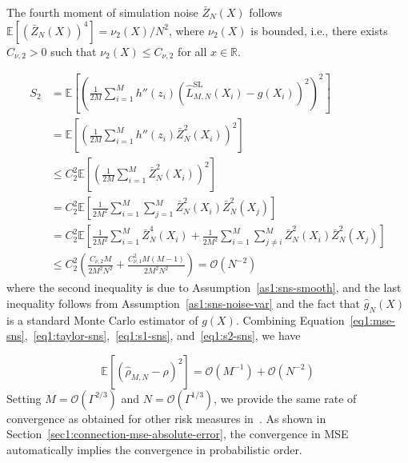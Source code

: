 \begin{assumption} \label{as1:sns-noise-var}
    The fourth moment of simulation noise $\bar{Z}_N(X)$ follows $\mathbb{E} \left[ \left( \bar{Z}_N(X) \right)^4 \right] = \nu_2(X) / N^2$, where $\nu_2(X)$ is bounded, i.e., there exists $C_{\nu,2} > 0$ such that $\nu_2(X) \leq C_{\nu,2}$ for all $x \in \mathbb{R}$.
\end{assumption}

\begin{align} \label{eq1:s2-sns}
    S_2 & = \mathbb{E} \left[ \left( \frac{1}{2M} \sum_{i=1}^M h''\left( z_i \right) \left( \hat{L}^{\text{SL}}_{M, N}(X_i) - g(X_i) \right)^2 \right)^2\right] \nonumber \\
    & = \mathbb{E} \left[ \left(\frac{1}{2M} \sum_{i=1}^M h''\left( z_i \right) \bar{Z}^2_N(X_i) \right)^2 \right] \nonumber \\
    & \leq C_2^2 \mathbb{E} \left[ \left(\frac{1}{2M} \sum_{i=1}^M \bar{Z}^2_N(X_i) \right)^2 \right] \nonumber \\
    & = C_2^2 \mathbb{E} \left[ \frac{1}{2M^2} \sum_{i=1}^M \sum_{j=1}^M \bar{Z}^2_N(X_i) \bar{Z}^2_N(X_j) \right] \nonumber \\
    & = C_2^2 \mathbb{E} \left[ \frac{1}{2M^2} \sum_{i=1}^M \bar{Z}_N^4(X_i) + \frac{1}{2M^2} \sum_{i=1}^M \sum_{j \neq i}^M \bar{Z}_N^2(X_i) \bar{Z}_N^2(X_j) \right] \nonumber \\
    & \leq  C_2^2 \left(\frac{ C_{\nu, 2} M}{2M^2N^2} + \frac{C_{\nu,1}^2M(M-1)}{2M^2N^2}\right) = \mathcal{O}(N^{-2})
\end{align}
where the second inequality is due to Assumption~\ref{as1:sns-smooth}, and the last inequality follows from Assumption~\ref{as1:sns-noise-var} and the fact that $\hat{g}_{N}(X)$ is a standard Monte Carlo estimator of $g(X)$.
Combining Equation~\ref{eq1:mse-sns},~\ref{eq1:taylor-sns},~\ref{eq1:s1-sns}, and~\ref{eq1:s2-sns}, we have

\begin{equation} \label{eq1:mse-sns-smooth}
    \mathbb{E} \left[ \left( \hat{\rho}_{M, N} - \rho \right)^2 \right] = \mathcal{O}(M^{-1}) + \mathcal{O}(N^{-2})
\end{equation}
Setting $M = \mathcal{O}(\Gamma^{2/3})$ and $N = \mathcal{O}(\Gamma^{1/3})$, we provide the same rate of convergence as obtained for other risk measures in~\cite{gordy2010nested}.
As shown in Section~\ref{sec1:connection-mse-absolute-error}, the convergence in MSE automatically implies the convergence in probabilistic order.


